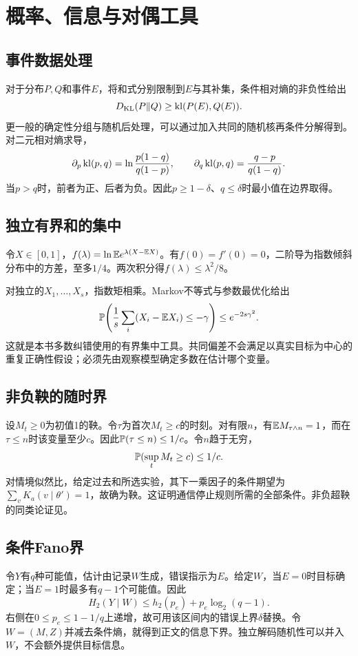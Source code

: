 \chapter{概率、信息与对偶工具}
\label{app:tools}

\section{事件数据处理}
对于分布$P,Q$和事件$E$，将和式分别限制到$E$与其补集，条件相对熵的非负性给出
\[
 D_{\mathrm{KL}}(P\Vert Q)\ge\operatorname{kl}(P(E),Q(E)).
\]
更一般的确定性分组与随机后处理，可以通过加入共同的随机核再条件分解得到。对二元相对熵求导，
\[
 \partial_p\operatorname{kl}(p,q)=\ln\frac{p(1-q)}{q(1-p)},\qquad
 \partial_q\operatorname{kl}(p,q)=\frac{q-p}{q(1-q)}.
\]
当$p>q$时，前者为正、后者为负。因此$p\ge1-\delta$、$q\le\delta$时最小值在边界取得。

\section{独立有界和的集中}
令$X\in[0,1]$，$f(\lambda)=\ln\mathbb E e^{\lambda(X-\mathbb E X)}$。有$f(0)=f'(0)=0$，二阶导为指数倾斜分布中的方差，至多$1/4$。两次积分得$f(\lambda)\le\lambda^2/8$。

对独立的$X_1,\ldots,X_s$，指数矩相乘。Markov不等式与参数最优化给出
\[
 \mathbb P\!\left(\frac1s\sum_i(X_i-\mathbb E X_i)\le-\gamma\right)
 \le e^{-2s\gamma^2}.
\]
这就是本书多数纠错使用的有界集中工具\citep{hoeffding1963}。共同偏差不会满足以真实目标为中心的重复正确性假设；必须先由观察模型确定多数在估计哪个变量。

\section{非负鞅的随时界}
设$M_t\ge0$为初值1的鞅。令$\tau$为首次$M_t\ge c$的时刻。对有限$n$，有$\mathbb E M_{\tau\wedge n}=1$，而在$\tau\le n$时该变量至少$c$。因此$\mathbb P(\tau\le n)\le1/c$。令$n$趋于无穷，
\[
 \mathbb P(\sup_tM_t\ge c)\le1/c.
\]
对情境似然比，给定过去和所选实验，其下一乘因子的条件期望为$\sum_vK_a(v\mid\theta')=1$，故确为鞅。这证明通信停止规则所需的全部条件。非负超鞅的同类论证见\citet{howard2020}。

\section{条件Fano界}
令$Y$有$q$种可能值，估计由记录$W$生成，错误指示为$E$。给定$W$，当$E=0$时目标确定；当$E=1$时最多有$q-1$个可能值。因此
\[
 H_2(Y\mid W)\le h_2(p_e)+p_e\log_2(q-1).
\]
右侧在$0\le p_e\le1-1/q$上递增，故可用该区间内的错误上界$\delta$替换。令$W=(M,Z)$并减去条件熵，就得到正文的信息下界。独立解码随机性可以并入$W$，不会额外提供目标信息。


